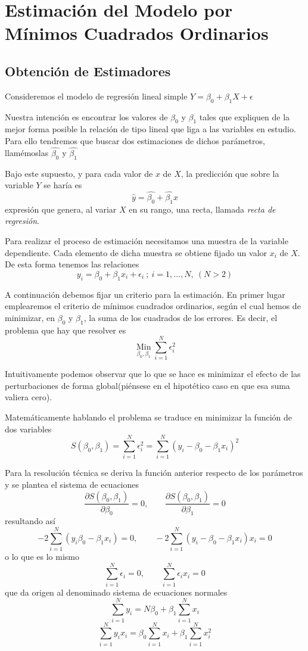 \documentclass[10pt,a4paper]{book}
\begin{document}
	\section{Estimación del Modelo por Mínimos Cuadrados Ordinarios}
		\subsection{Obtención de Estimadores}
Consideremos el modelo de regresión lineal simple $Y=\beta_0 + \beta_1X + \epsilon$

Nuestra intención es encontrar los valores de $\beta_0$ y $\beta_1$ tales que expliquen de la mejor forma posible la relación de tipo lineal que liga a las variables en estudio. Para ello tendremos que buscar dos estimaciones de dichos parámetros, llamémoslas $\widehat{\beta_0}$ y $\widehat{\beta_1}$

Bajo este supuesto, y para cada valor de $x$ de $X$, la predicción que sobre la variable $Y$ se haría es $$\widehat{y}=\widehat{\beta_0}+\widehat{\beta_1}x$$ expresión que genera, al variar $X$ en su rango, una recta, llamada \textit{recta de regresión}.

Para realizar el proceso de estimación necesitamos una muestra de la variable dependiente. Cada elemento de dicha muestra se obtiene fijado un valor $x_i$ de $X$. De esta forma tenemos las relaciones $$y_i=\beta_0+\beta_1x_i+\epsilon_i\ ;\ i=1,...,N,\ (N > 2)$$

A continuación debemos fijar un criterio para la estimación. En primer lugar emplearemos el criterio de mínimos cuadrados ordinarios, según el cual hemos de minimizar, en $\beta_0$ y $\beta_1$, la suma de los cuadrados de los errores. Es decir, el problema que hay que resolver es  $$\operatorname*{Min}\limits_{\beta_0,\beta_1}\sum^N_{i=1}\epsilon^2_i$$ 

Intuitivamente podemos observar que lo que se hace es minimizar el efecto de las perturbaciones de forma global(piénsese en el hipotético caso en que esa suma valiera cero).

Matemáticamente hablando el problema se traduce en minimizar la función de dos variables $$ S(\beta_0,\beta_1)=\sum_{i=1}^N\epsilon_i^2=\sum_{i=1}^N(y_i-\beta_0-\beta_1x_i)^2$$

Para la resolución técnica se deriva la función anterior respecto de los parámetros y se plantea el sistema de ecuaciones  $$\frac{\partial S(\beta_0,\beta_1)}{\partial \beta_0}=0, \qquad \frac{\partial S(\beta_0,\beta_1)}{\partial \beta_1}=0$$ resultando así $$-2\sum^N_{i=1}(y_i\beta_0-\beta_1x_i)=0,\qquad -2\sum^N_{i=1}(y_i-\beta_0-\beta_1x_i)x_i=0$$ o lo que es lo mismo $$\sum^N_{i=1}\epsilon_i=0,\qquad \sum^N_{i=1}\epsilon_ix_i=0$$ que da origen al denominado sistema de ecuaciones normales $$\sum^N_{i=1}y_i=N\beta_0+\beta_1\sum^N_{i=1}x_i$$ $$\sum^N_{i=1}y_ix_i=\beta_0\sum^N_{i=1}x_i+\beta_1\sum^N_{i=1}x_i^2$$
\end{document}
